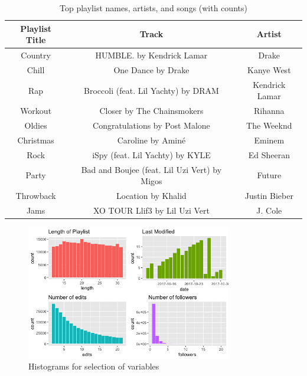 \documentclass{article} %
\begin{document}
\begin{table}[h!]
\caption{Top playlist names, artists, and songs (with counts)}
\centering
  \begin{tabular}{|c|c|c|} 
  	\hline 
  	Playlist Title & Track & Artist \\
  	\hline
  	Country  & HUMBLE. by Kendrick Lamar  & Drake  \\ 
  	Chill  & One Dance by Drake  & Kanye West  \\
  	Rap  & Broccoli (feat. Lil Yachty) by DRAM  & Kendrick Lamar  \\
  	Workout  & Closer by The Chainsmokers  & Rihanna  \\
  	Oldies  & Congratulations by Post Malone  & The Weeknd  \\
  	Christmas  & Caroline by Aminé  & Eminem  \\
  	Rock  & iSpy (feat. Lil Yachty) by KYLE  & Ed Sheeran  \\
  	Party  & Bad and Boujee (feat. Lil Uzi Vert) by Migos  & Future  \\
  	Throwback  & Location by Khalid  & Justin Bieber  \\
  	Jams  & XO TOUR Llif3 by Lil Uzi Vert  & J. Cole \\
  	\hline
 \end{tabular}
\end{table}

\begin{figure}
  \centering
  \includegraphics[width = 0.8\textwidth]{histograms.png}
  \caption{Histograms for selection of variables}
  \label{fig:boat1}
\end{figure}
\end{document}
